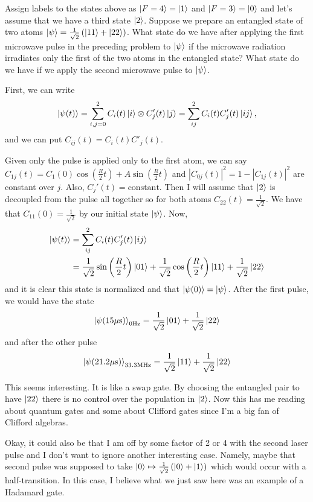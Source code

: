 \documentclass[12pt]{article} %
\begin{document}
\newpage
\begin{problem}
Assign labels to the states above as $\ket{F=4}=\ket{1}$ and $\ket{F=3}=\ket{0}$ and let's assume that we have a third state $\ket{2}$. Suppose we prepare an entangled state of two atoms $\ket{\psi}=\frac{1}{\sqrt{2}}\left( \ket{11} + \ket{22}\right)$. What state do we have after applying the first microwave pulse in the preceding problem to $\ket{\psi}$ if the microwave radiation irradiates only the first of the two atoms in the entangled state? What state do we have if we apply the second microwave pulse to $\ket{\psi}$.
\end{problem}
\begin{solution}
First, we can write
\begin{equation}
\ket{\psi(t)} = \sum_{i,j=0}^2 C_{i}(t) \ket{i} \otimes C_{j}'(t) \ket{j} = \sum_{ij}^2 C_i(t)C_j'(t) \ket{ij},
\end{equation}
and we can put $C_{ij}(t)=C_i(t)C'_j(t)$. 

Given only the pulse is applied only to the first atom, we can say $C_{1j}(t)=C_1(0)\cos \left( \frac{R}{2}t\right) + A \sin\left(\frac{R}{2} t\right)$ and $|C_{0j}(t)|^2 = 1-|C_{1j}(t)|^2$ are constant over $j$. Also, $C_j'(t) = \textrm{constant}$. Then I will assume that $\ket{2}$ is decoupled from the pulse all together so for both atoms $C_{22}(t)=\frac{1}{\sqrt{2}}$. We have that $C_{11}(0)=\frac{1}{\sqrt{2}}$ by our initial state $\ket{\psi}$. Now, 
\begin{align}
\ket{\psi(t)} &= \sum_{ij}^2 C_i(t)C_j'(t) \ket{ij}  \\
&= \frac{1}{\sqrt{2}}\sin\left(\frac{R}{2} t\right) \ket{01} + \frac{1}{\sqrt{2}} \cos\left(\frac{R}{2} t\right) \ket{11} + \frac{1}{\sqrt{2}}\ket{22}
\end{align}
and it is clear this state is normalized and that $\ket{\psi(0)}=\ket{\psi}$. After the first pulse, we would have the state
\begin{equation}
\ket{\psi(15\si{\mu s})}_{0\si{Hz}} = \frac{1}{\sqrt{2}} \ket{01} + \frac{1}{\sqrt{2}} \ket{22}
\end{equation}
and after the other pulse
\begin{equation}
\ket{\psi(21.2\si{\mu s})}_{33.3\si{MHz}} = \frac{1}{\sqrt{2}} \ket{11} + \frac{1}{\sqrt{2}} \ket{22}
\end{equation}
\begin{remark}
This seems interesting. It is like a swap gate. By choosing the entangled pair to have $\ket{22}$ there is no control over the population in $\ket{2}$. Now this has me reading about quantum gates and some about Clifford gates since I'm a big fan of Clifford algebras.
\end{remark}

Okay, it could also be that I am off by some factor of 2 or 4 with the second laser pulse and I don't want to ignore another interesting case. Namely, maybe that second pulse was supposed to take $\ket{0} \mapsto \frac{1}{\sqrt{2}} \left( \ket{0} + \ket{1} \right)$ which would occur with a half-transition. In this case, I believe what we just saw here was an example of a Hadamard gate.
\end{solution}
\end{document}

